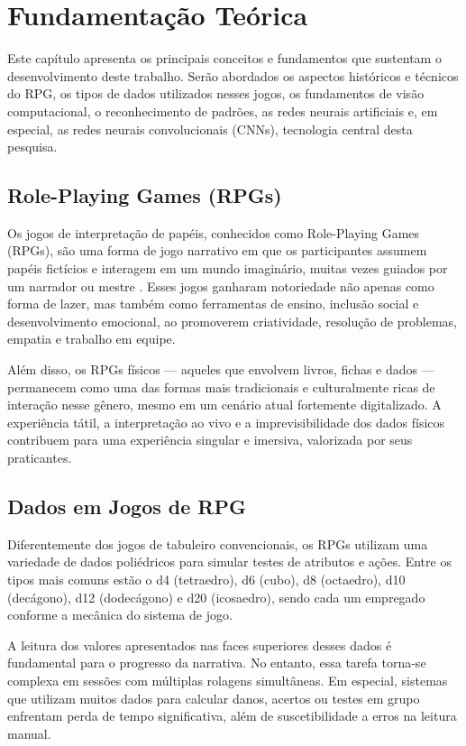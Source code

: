 \section{Fundamentação Teórica}

Este capítulo apresenta os principais conceitos e fundamentos
que sustentam o desenvolvimento deste trabalho. Serão abordados
os aspectos históricos e técnicos do RPG, os tipos de dados
utilizados nesses jogos, os fundamentos de visão computacional,
o reconhecimento de padrões, as redes neurais artificiais e,
em especial, as redes neurais convolucionais (CNNs), tecnologia
central desta pesquisa.

\subsection{Role-Playing Games (RPGs)}

Os jogos de interpretação de papéis, conhecidos como Role-Playing
Games (RPGs), são uma forma de jogo narrativo em que os
participantes assumem papéis fictícios e interagem em um mundo
imaginário, muitas vezes guiados por um narrador ou mestre
\cite{hitchens2007roleplaying}. Esses jogos ganharam notoriedade
não apenas como forma de lazer, mas também como ferramentas de
ensino, inclusão social e desenvolvimento emocional, ao promoverem
criatividade, resolução de problemas, empatia e trabalho em equipe.

Além disso, os RPGs físicos — aqueles que envolvem livros, fichas
e dados — permanecem como uma das formas mais tradicionais e
culturalmente ricas de interação nesse gênero, mesmo em um cenário
atual fortemente digitalizado. A experiência tátil, a interpretação
ao vivo e a imprevisibilidade dos dados físicos contribuem para
uma experiência singular e imersiva, valorizada por seus praticantes.

\subsection{Dados em Jogos de RPG}

Diferentemente dos jogos de tabuleiro convencionais, os RPGs
utilizam uma variedade de dados poliédricos para simular testes
de atributos e ações. Entre os tipos mais comuns estão o d4
(tetraedro), d6 (cubo), d8 (octaedro), d10 (decágono), d12
(dodecágono) e d20 (icosaedro), sendo cada um empregado conforme
a mecânica do sistema de jogo.

A leitura dos valores apresentados nas faces superiores desses
dados é fundamental para o progresso da narrativa. No entanto,
essa tarefa torna-se complexa em sessões com múltiplas rolagens
simultâneas. Em especial, sistemas que utilizam muitos dados para
calcular danos, acertos ou testes em grupo enfrentam perda de tempo
significativa, além de suscetibilidade a erros na leitura manual.

